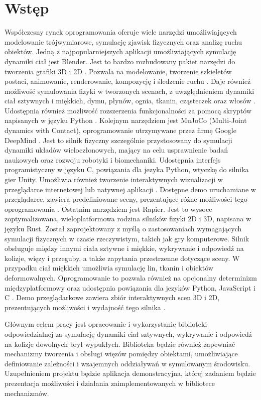 \section*{Wstęp}
Współczesny rynek oprogramowania oferuje wiele narzędzi umożliwiających
modelowanie trójwymiarowe, symulację zjawisk fizycznych oraz analizę ruchu obiektów.
Jedną z najpopularniejszych aplikacji umożliwiających symulację dynamiki ciał jest
Blender. Jest to bardzo rozbudowany pakiet narzędzi do tworzenia grafiki 3D i 2D \cite{blender}.
Pozwala na modelowanie, tworzenie szkieletów postaci, animowanie,
renderowanie, kompozycję i śledzenie ruchu \cite{blenderFeat}.
Daje również możliwość symulowania fizyki w tworzonych scenach,
z uwzględnieniem dynamiki ciał sztywnych i miękkich, dymu,
płynów, ognia, tkanin, cząsteczek oraz włosów \cite{blenderSim}.
Udostępnia również możliwość rozszerzenia funkcjonalności za pomocą
skryptów napisanych w języku Python \cite{blenderSkrypt}. Kolejnym narzędziem jest
MuJoCo (Multi-Joint dynamics with Contact),
oprogramowanie utrzymywane przez firmę Google DeepMind \cite{deepMind}.
Jest to silnik fizyczny szczególnie przystosowany do symulacji dynamiki układów wieloczłonowych,
mający na celu usprawnienie badań naukowych oraz rozwoju robotyki i biomechaniki.
Udostępnia interfejs programistyczny w języku C, powiązania dla jezyka Python,
wtyczkę do silnika gier Unity. Umożliwia również tworzenie interaktywnych
wizualizacji w przeglądarce internetowej lub natywnej aplikacji \cite{MuJoCo}.
Dostępne demo uruchamiane w przeglądarce, zawiera predefiniowane sceny,
prezentujące różne możliwości tego oprogramowania \cite{MuJoCoDemo}. Ostatnim narzędziem jest
Rapier. Jest to wysoce zoptymalizowana, wieloplatformowa rodzina silników fizyki 2D i 3D, napisana w języku Rust. 
Został zaprojektowany z myślą o zastosowaniach wymagających symulacji fizycznych w czasie rzeczywistym,
takich jak gry komputerowe. 
Silnik obsługuje między innymi ciała sztywne i miękkie, wykrywanie i odpowiedź na kolizje,
więzy i przeguby, a także zapytania przestrzenne dotyczące sceny.
W przypadku ciał miękkich umożliwia symulację lin, tkanin i obiektów deformowalnych.
Oprogramowanie to pozwala również na opcjonalny determinizm międzyplatformowy oraz udostępnia
powiązania dla jezyków Python, JavaScript i C \cite{Rapier,RapierDocs}.
Demo przeglądarkowe zawiera zbiór interaktywnych scen 3D i 2D, prezentujących możliwości
i wydajność tego silnika \cite{RapierDemo,RapierDemo2D}.


Głównym celem pracy jest opracowanie i wykorzystanie biblioteki odpowiedzialnej za symulację dynamiki ciał sztywnych,
wykrywanie i odpowiedź na kolizje dowolnych brył wypukłych.
Biblioteka będzie również zapewniać mechanizmy tworzenia i obsługi więzów pomiędzy obiektami,
umożliwiające definiowanie zależności i wzajemnych oddziaływań w symulowanym środowisku.
Uzupełnieniem projektu będzie aplikacja demonstracyjna,
której zadaniem będzie prezentacja możliwości i działania zaimplementowanych w bibliotece mechanizmów.


